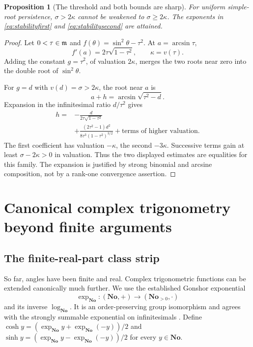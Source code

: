 \documentclass[11pt,letterpaper]{article}
\newtheorem{proposition}[theorem]{Proposition}
\theoremstyle{definition}
\theoremstyle{remark}
\newcommand{\No}{\mathbf{No}}
\newcommand{\arcs}{\operatorname{arcsin}}
\numberwithin{equation}{section}
\begin{document}
\begin{proposition}[The threshold and both bounds are sharp]\label{prop:sharp}
For uniform simple-root persistence, $\sigma>2\kappa$ cannot be weakened to $\sigma\ge2\kappa$. The exponents in \eqref{eq:stabilityfirst} and \eqref{eq:stabilitysecond} are attained.
\end{proposition}
\begin{proof}
Let $0<\tau\in\mathfrak m$ and $f(\theta)=\sin^2\theta-\tau^2$. At $a=\arcs\tau$,
\[
 f'(a)=2\tau\sqrt{1-\tau^2},\qquad \kappa=v(\tau).
\]
Adding the constant $g=\tau^2$, of valuation $2\kappa$, merges the two roots near zero into the double root of $\sin^2\theta$.

For $g=d$ with $v(d)=\sigma>2\kappa$, the root near $a$ is
\[
 a+h=\arcs\sqrt{\tau^2-d}.
\]
Expansion in the infinitesimal ratio $d/\tau^2$ gives
\begin{align*}
 h={}&-\frac{d}{2\tau\sqrt{1-\tau^2}}\\
 &+\frac{(2\tau^2-1)d^2}
 {8\tau^3(1-\tau^2)^{3/2}}+\text{terms of higher valuation}.
\end{align*}
The first coefficient has valuation $-\kappa$, the second $-3\kappa$. Successive terms gain at least $\sigma-2\kappa>0$ in valuation. Thus the two displayed estimates are equalities for this family. The expansion is justified by strong binomial and arcsine composition, not by a rank-one convergence assertion.
\end{proof}

\section{Canonical complex trigonometry beyond finite arguments}\label{sec:complex}
\subsection{The finite-real-part class strip}
So far, angles have been finite and real. Complex trigonometric functions can be extended canonically much further. We use the established Gonshor exponential
\[
 \exp_\No:(\No,+)\longrightarrow(\No_{>0},\cdot)
\]
and its inverse $\log_\No$. It is an order-preserving group isomorphism and agrees with the strongly summable exponential on infinitesimals \cite{Gonshor,vdDE}. Define $\cosh y=(\exp_\No y+\exp_\No(-y))/2$ and $\sinh y=(\exp_\No y-\exp_\No(-y))/2$ for every $y\in\No$.
\end{document}
